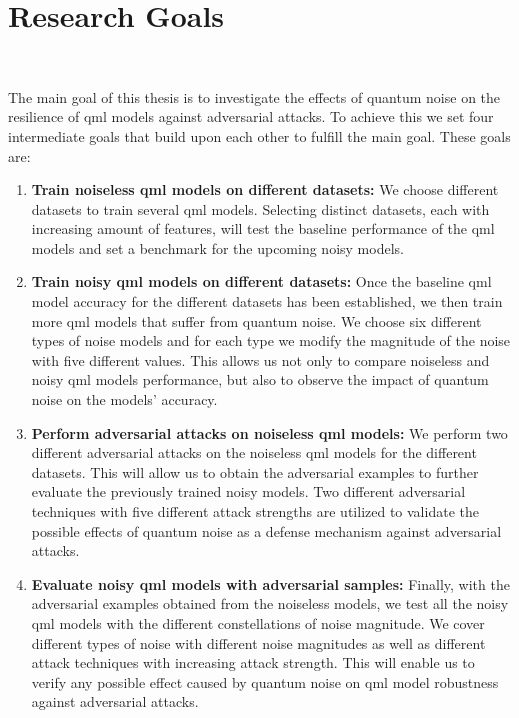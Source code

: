 \section{Research Goals}\label{section:research_goals} \

The main goal of this thesis is to investigate the effects of quantum noise
on the resilience of \ac{qml} models against adversarial
attacks. To achieve this we set four intermediate goals that build
upon each other to fulfill the main goal. These goals are: \

\begin{enumerate}
    \item \textbf{Train noiseless \ac{qml} models on different datasets:}
            We choose different datasets to train several \ac{qml} models.
            Selecting distinct datasets, each with increasing amount of
            features, will test the baseline performance of the \ac{qml}
            models and set a benchmark for the upcoming noisy models. \
    \item \textbf{Train noisy \ac{qml} models on different datasets:} Once
            the baseline \ac{qml} model accuracy for the different datasets
            has been established, we then train more \ac{qml} models that
            suffer from quantum noise. We choose six different types of
            noise models and for each type we modify the magnitude of the
            noise with five different values. This allows us not only
            to compare noiseless and noisy \ac{qml} models performance,
            but also to observe the impact of quantum noise on the models'
            accuracy. \
    \item \textbf{Perform adversarial attacks on noiseless \ac{qml} models:}
            We perform two different adversarial attacks on the noiseless
            \ac{qml} models for the different datasets. This will allow
            us to obtain the adversarial examples to further evaluate the
            previously trained noisy models. Two different adversarial
            techniques with five different attack strengths are utilized
            to validate the possible effects of quantum noise as a defense
            mechanism against adversarial attacks. \
    \item \textbf{Evaluate noisy \ac{qml} models with adversarial samples:}
            Finally, with the adversarial examples obtained from the noiseless
            models, we test all the noisy \ac{qml} models with the different
            constellations of noise magnitude. We cover different types of noise
            with different noise magnitudes as well as different attack techniques
            with increasing attack strength. This will enable us to verify
            any possible effect caused by quantum noise on \ac{qml} model robustness
            against adversarial attacks. \
\end{enumerate} \

